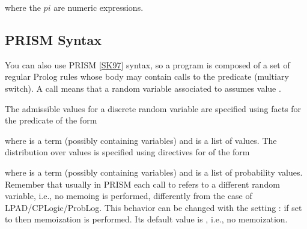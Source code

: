 \documentclass[letterpaper,10pt,english]{sphinxmanual}
\begin{document}
\sphinxAtStartPar
where the \(pi\) are numeric expressions.


\subsection{PRISM Syntax}
\label{\detokenize{index:prism-syntax}}
\sphinxAtStartPar
You can also use PRISM {[}\hyperlink{cite.index:id47}{SK97}{]} syntax, so a program is composed of a set of regular Prolog rules whose body may contain calls to the  predicate (multi\sphinxhyphen{}ary switch).
A call  means that a random variable associated to  assumes value .

\sphinxAtStartPar
The admissible values for a discrete random variable are specified using facts for the  predicate
of the form

\begin{sphinxVerbatim}[commandchars=\\\{\}]
\end{sphinxVerbatim}

\sphinxAtStartPar
where  is a term (possibly containing variables) and  is a list of values.
The distribution over values is specified using directives for  of the form

\begin{sphinxVerbatim}[commandchars=\\\{\}]
 
\end{sphinxVerbatim}

\sphinxAtStartPar
where  is a term (possibly containing variables) and  is a list of probability values.
Remember that usually in PRISM each call to  refers to a different random variable, i.e., no memoing is performed, differently from the case of LPAD/CP\sphinxhyphen{}Logic/ProbLog.
This behavior can be changed with the setting : if set to  then memoization is performed.
Its default value is , i.e., no memoization.
\end{document}
